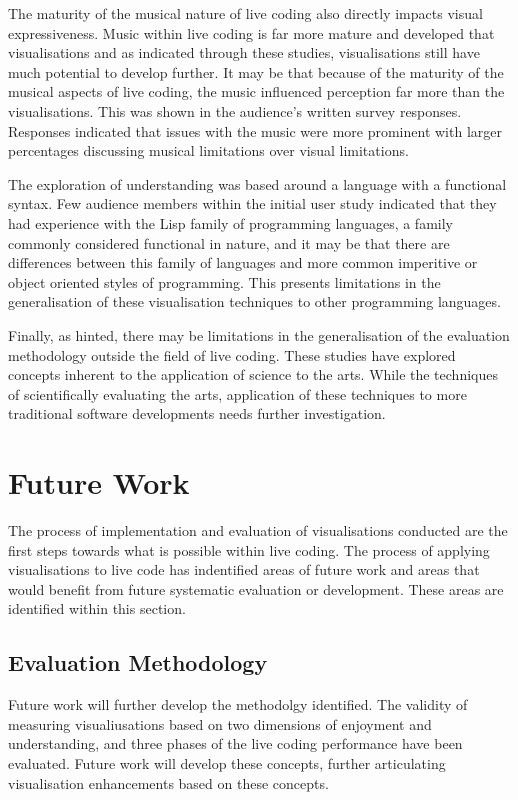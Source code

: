 The maturity of the musical nature of live coding also directly impacts visual expressiveness. Music within live coding is far more mature and developed that visualisations and as indicated through these studies, visualisations still have much potential to develop further. It may be that because of the maturity of the musical aspects of live coding, the music influenced perception far more than the visualisations. This was shown in the audience's written survey responses. Responses indicated that issues with the music were more prominent with larger percentages discussing musical limitations over visual limitations.

The exploration of understanding was based around a language with a functional syntax. Few audience members within the initial user study indicated that they had experience with the Lisp family of programming languages, a family commonly considered functional in nature, and it may be that there are differences between this family of languages and more common imperitive or object oriented styles of programming. This presents limitations in the generalisation of these visualisation techniques to other programming languages.

Finally, as hinted, there may be limitations in the generalisation of the evaluation methodology outside the field of live coding. These studies have explored concepts inherent to the application of science to the arts. While the techniques of scientifically evaluating the arts, application of these techniques to more traditional software developments needs further investigation.

\section{Future Work}

The process of implementation and evaluation of visualisations conducted are the first steps towards what is possible within live coding. The process of applying visualisations to live code has indentified areas of future work and areas that would benefit from future systematic evaluation or development. These areas are identified within this section. 

\subsection{Evaluation Methodology}

Future work will further develop the methodolgy identified. The validity of measuring visualiusations based on two dimensions of enjoyment and understanding, and three phases of the live coding performance have been evaluated. Future work will develop these concepts, further articulating visualisation enhancements based on these concepts. 

